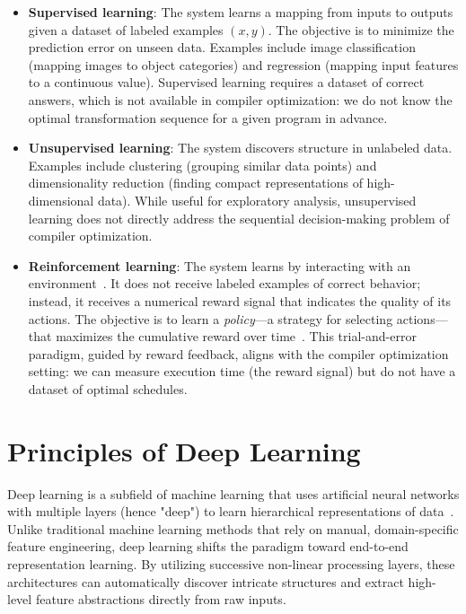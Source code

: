 \begin{itemize}
    \item \textbf{Supervised learning}: The system learns a mapping from inputs to outputs given a dataset of labeled examples $(x, y)$. The objective is to minimize the prediction error on unseen data. Examples include image classification (mapping images to object categories) and regression (mapping input features to a continuous value). Supervised learning requires a dataset of correct answers, which is not available in compiler optimization: we do not know the optimal transformation sequence for a given program in advance.

    \item \textbf{Unsupervised learning}: The system discovers structure in unlabeled data. Examples include clustering (grouping similar data points) and dimensionality reduction (finding compact representations of high-dimensional data). While useful for exploratory analysis, unsupervised learning does not directly address the sequential decision-making problem of compiler optimization.

    \item \textbf{Reinforcement learning}: The system learns by interacting with an environment~\cite{sutton2018reinforcement}. It does not receive labeled examples of correct behavior; instead, it receives a numerical reward signal that indicates the quality of its actions. The objective is to learn a \textit{policy}—a strategy for selecting actions—that maximizes the cumulative reward over time~\cite{sutton2018reinforcement}. This trial-and-error paradigm, guided by reward feedback, aligns with the compiler optimization setting: we can measure execution time (the reward signal) but do not have a dataset of optimal schedules.
\end{itemize}

\section{Principles of Deep Learning}

Deep learning is a subfield of machine learning that uses artificial neural networks with multiple layers (hence "deep") to learn hierarchical representations of data~\cite{lecun2015deep}. Unlike traditional machine learning methods that rely on manual, domain-specific feature engineering, deep learning shifts the paradigm toward end-to-end representation learning. By utilizing successive non-linear processing layers, these architectures can automatically discover intricate structures and extract high-level feature abstractions directly from raw inputs. 

